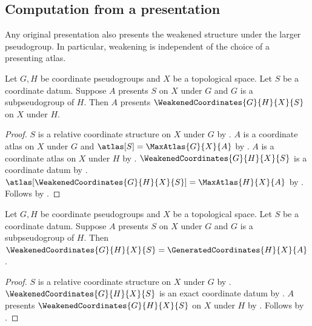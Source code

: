 \subsection{Computation from a presentation}

Any original presentation also presents the weakened structure under the
larger pseudogroup. In particular, weakening is independent of the choice
of a presenting atlas.

\begin{theorem}\label{weakened_coordinates_presentation}
    Let $G,H$ be coordinate pseudogroups and $X$ be a topological space.
    Let $S$ be a coordinate datum.
    Suppose $A$ presents $S$ on $X$ under $G$ and $G$ is a subpseudogroup of $H$.
    Then $A$ presents $\WeakenedCoordinates{G}{H}{X}{S}$ on $X$ under $H$.
\end{theorem}
\begin{proof}
    $S$ is a relative coordinate structure on $X$ under $G$ by .
    $A$ is a coordinate atlas on $X$ under $G$ and $\atlas[S]=\MaxAtlas{G}{X}{A}$ by
        .
    $A$ is a coordinate atlas on $X$ under $H$ by .
    $\WeakenedCoordinates{G}{H}{X}{S}$ is a coordinate datum by
        .
    $\atlas[\WeakenedCoordinates{G}{H}{X}{S}]=\MaxAtlas{H}{X}{A}$ by
        .
    Follows by .
\end{proof}

\begin{theorem}\label{weakened_coordinates_from_presentation}
    Let $G,H$ be coordinate pseudogroups and $X$ be a topological space.
    Let $S$ be a coordinate datum.
    Suppose $A$ presents $S$ on $X$ under $G$ and $G$ is a subpseudogroup of $H$.
    Then $\WeakenedCoordinates{G}{H}{X}{S}=\GeneratedCoordinates{H}{X}{A}$.
\end{theorem}
\begin{proof}
    $S$ is a relative coordinate structure on $X$ under $G$ by .
    $\WeakenedCoordinates{G}{H}{X}{S}$ is an exact coordinate datum by
        .
    $A$ presents $\WeakenedCoordinates{G}{H}{X}{S}$ on $X$ under $H$ by
        .
    Follows by .
\end{proof}

